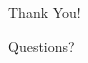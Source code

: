 \documentclass[aspectratio=169]{beamer}
\begin{document}
\begin{frame}{}
	\begin{center}
		\Huge Thank You!
		
		\vspace{1cm}
		
		\Large Questions?
	\end{center}
\end{frame}
\end{document}
